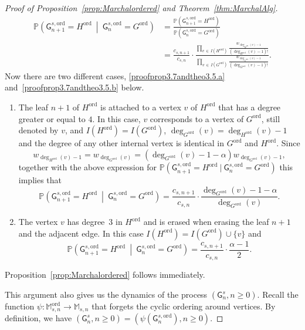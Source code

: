\documentclass[AHL,Unicode,longabstracts,published]{cedram}
\newcommand{\Pp}[1]{\mathbb{P} \left(#1\right)}
\newcommand{\ord}{\mathrm{ord}}
\newcommand{\sG}{\mathsf{G}}
\newcommand{\M}{\mathbb{M}}
\newcommand*{\alphenumi}{\renewcommand*{\theenumi}{\alph{enumi}}}
\begin{document}
\begin{proof}[Proof of Proposition~\ref{prop:Marchalordered} and Theorem~\ref{thm:MarchalAlg}]
\begin{align*}
\Pp{\sG^{s,\ord}_{n+1}=H^{\ord} \ \middle|\ \sG^{s,\ord}_{n}=G^{\ord}} &= \frac{\Pp{\sG^{s,\ord}_{n+1}=H^{\ord}}}{\Pp{\sG^{s,\ord}_{n}=G^{\ord}}} \\
&= \frac{c_{s,n+1}}{c_{s,n}} \cdot \frac{\displaystyle \prod_{v\,\in\,I\left(H^{\ord}\right)}\frac{w_{\deg_{H^{\ord}}(v)-1}}{\left(\deg_{H^{\ord}}(v)-1\right)!}}{\displaystyle \prod_{v\,\in\,I\left(G^{\ord}\right)}\frac{w_{\deg_{G^{\ord}}(v)-1}}{\left(\deg_{G^{\ord}}(v)-1\right)!}}.
\end{align*}
Now there are two different cases, \eqref{proofprop3.7andtheo3.5.a} and~\eqref{proofprop3.7andtheo3.5.b} below.
\begin{enumerate}\alphenumi
\item\label{proofprop3.7andtheo3.5.a} The leaf $n+1$ of $H^{\ord}$ is attached to a vertex $v$ of $H^{\ord}$ that has a degree greater or equal to $4$. In this case, $v$ corresponds to a vertex of $G^{\ord}$, still denoted by $v$, and $I(H^{\ord})=I(G^{\ord})$, $\deg_{G^{\ord}}(v)=\deg_{H^{\ord}}(v)-1$ and the degree of any other internal vertex is identical in $G^{\ord}$ and $H^{\ord}$. Since
\[
w_{\deg_{H^{\ord}}(v)-1}=w_{\deg_{G^{\ord}}(v)}=\left(\deg_{G^{\ord}}(v) -1-\alpha\right)w_{\deg_{G^{\ord}}(v)-1},
\]
together with the above expression for $\Pp{\sG^{s,\ord}_{n+1}=H^{\ord} \ | \ \sG^{s,\ord}_{n}=G^{\ord}}$ this implies that
\begin{equation}\label{eq:marchal algo on vertex}
\Pp{\sG^{s,\ord}_{n+1}=H^{\ord} \ \middle|\ \sG^{s,\ord}_{n}=G^{\ord}}=\frac{c_{s,n+1}}{c_{s,n}} \cdot \frac{\deg_{G^{\ord}}(v) -1-\alpha}{\deg_{G^{\ord}}(v)}.
\end{equation}
\item\label{proofprop3.7andtheo3.5.b} The vertex $v$ has degree~$3$ in $H^{\ord}$ and is erased when erasing the leaf $n+1$ and the adjacent edge. In this case $I(H^{\ord})=I(G^{\ord})\cup \{v\}$ and
\begin{equation}\label{eq:marchal algo on edge}
\Pp{\sG^{s,\ord}_{n+1}=H^{\ord}\ \middle| \ \sG^{s,\ord}_{n}=G^{\ord}}=\frac{c_{s,n+1}}{c_{s,n}} \cdot \frac{\alpha-1}{2}.
\end{equation}
\end{enumerate}
Proposition~\ref{prop:Marchalordered} follows immediately.

This argument also gives us the dynamics of the process $(\sG^s_n,n \geq 0)$. Recall the function $\psi:\M^{\ord}_{s,n}\rightarrow \M_{s,n}$ that forgets the cyclic ordering around vertices. By definition, we have $(\sG^s_n,n \geq 0)=( \psi(\sG^{s,\ord}_{n}), n\geq 0)$.


\end{proof}
\end{document}
